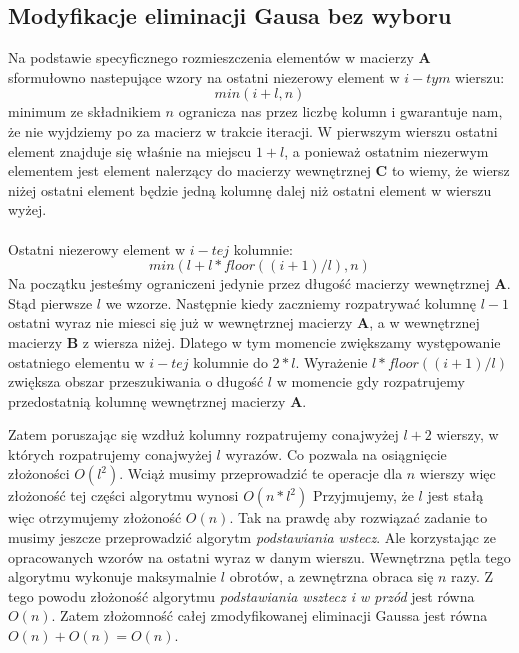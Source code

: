 \documentclass[]{article}
\begin{document}
\subsection{Modyfikacje eliminacji Gausa bez wyboru}
Na podstawie specyficznego rozmieszczenia elementów w macierzy \textbf{A} sformułowno nastepujące wzory na ostatni niezerowy element w $i-tym$ wierszu:
\[ min(i + l, n) \]
minimum ze składnikiem $n$ ogranicza nas przez liczbę kolumn i gwarantuje nam, że nie wyjdziemy po za macierz w trakcie iteracji. W pierwszym wierszu ostatni element znajduje się właśnie na miejscu $1 + l$, a ponieważ ostatnim niezerwym elementem jest element nalerzący do macierzy wewnętrznej \textbf{C} to wiemy, że wiersz niżej ostatni element będzie jedną kolumnę dalej niż ostatni element w wierszu wyżej.
\\\\
Ostatni niezerowy element w $i-tej$ kolumnie: 
\[min(l + l * floor((i + 1)/l), n) \]
Na początku jesteśmy ograniczeni jedynie przez długość macierzy wewnętrznej \textbf{A}. Stąd pierwsze $l$ we wzorze. Następnie kiedy zaczniemy rozpatrywać kolumnę $l - 1$ ostatni wyraz nie miesci się już w wewnętrznej macierzy \textbf{A}, a w wewnętrznej macierzy \textbf{B} z wiersza niżej. Dlatego w tym momencie zwiększamy występowanie ostatniego elementu w $i-tej$ kolumnie do $2*l$. Wyrażenie $l * floor((i + 1)/l)$ zwiększa obszar przeszukiwania o długość $l$ w momencie gdy rozpatrujemy przedostatnią kolumnę wewnętrznej macierzy \textbf{A}.


Zatem poruszając się wzdłuż kolumny rozpatrujemy conajwyżej $l+2$ wierszy, w których rozpatrujemy conajwyżej $l$ wyrazów. Co pozwala na osiągnięcie złożoności $O(l^2)$. Wciąż musimy przeprowadzić te operacje dla $n$ wierszy więc złożoność tej części algorytmu wynosi $O(n * l^2)$ Przyjmujemy, że $l$ jest stałą więc otrzymujemy złożoność $O(n)$. Tak na prawdę aby rozwiązać zadanie to musimy jeszcze przeprowadzić algorytm \textit{podstawiania wstecz}. Ale korzystając ze opracowanych wzorów na ostatni wyraz w danym wierszu. Wewnętrzna pętla tego algorytmu wykonuje maksymalnie $l$ obrotów, a zewnętrzna obraca się $n$ razy. Z tego powodu złożoność algorytmu \textit{podstawiania wsztecz i w przód} jest równa $O(n)$. Zatem złożomność całej zmodyfikowanej eliminacji Gaussa jest równa $O(n)+O(n)=O(n)$.  
     
\end{document}
